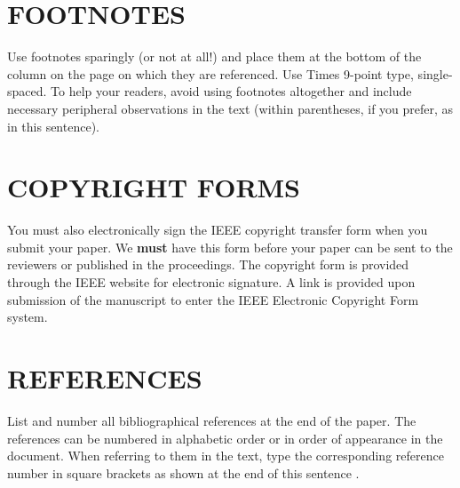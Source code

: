 \documentclass{article}
\begin{document}
\vfill
\pagebreak


\section{FOOTNOTES}
\label{sec:foot}

Use footnotes sparingly (or not at all!) and place them at the bottom of the
column on the page on which they are referenced. Use Times 9-point type,
single-spaced. To help your readers, avoid using footnotes altogether and
include necessary peripheral observations in the text (within parentheses, if
you prefer, as in this sentence).


\section{COPYRIGHT FORMS}
\label{sec:copyright}

You must also electronically sign the IEEE copyright transfer
form when you submit your paper. We {\bf must} have this form
before your paper can be sent to the reviewers or published in
the proceedings. The copyright form is provided through the IEEE
website for electronic signature. A link is provided upon
submission of the manuscript to enter the IEEE Electronic
Copyright Form system.

\section{REFERENCES}
\label{sec:ref}

List and number all bibliographical references at the end of the paper.  The references can be numbered in alphabetic order or in order of appearance in the document.  When referring to them in the text, type the corresponding reference number in square brackets as shown at the end of this sentence \cite{C2}.



\end{document}
